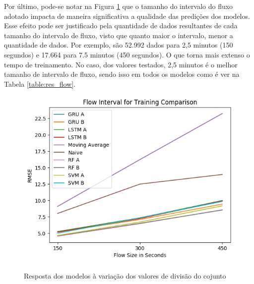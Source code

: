 Por último, pode-se notar na Figura \ref{figure:res_flow} que o tamanho do intervalo do fluxo adotado impacta de maneira significativa a qualidade das predições dos modelos. Esse efeito pode ser justificado pela quantidade de dados resultantes de cada tamanho do intervalo de fluxo, visto que quanto maior o intervalo, menor a quantidade de dados. Por exemplo, são 52.992 dados para 2,5 minutos (150 segundos) e 17.664 para 7.5 minutos (450 segundos). O que torna mais extenso o tempo de treinamento. No caso, dos valores testados, 2,5 minutos é o melhor tamanho de intervalo de fluxo, sendo isso em todos os modelos como é ver na Tabela \ref{table:res_flow}.

\begin{figure}[htbp]
    \centering
    \includegraphics[scale=0.8]{monography/img/flow_interval_for_training_comparison_rmse.png}
    \label{figure:res_flow}
    \caption{Resposta dos modelos à variação dos valores de divisão do cojunto}
\end{figure}

